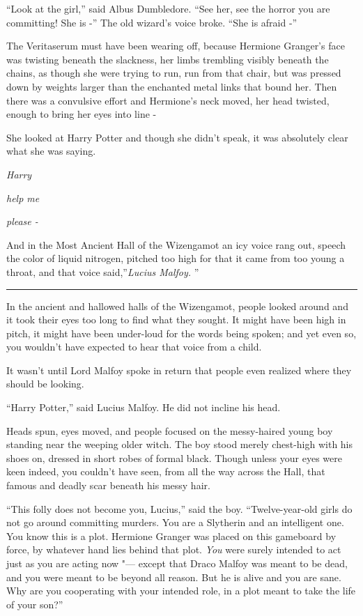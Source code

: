 ``Look at the girl,'' said Albus Dumbledore. ``See her, see the horror
you are committing! She is -'' The old wizard's voice broke. ``She is
afraid -''

The Veritaserum must have been wearing off, because Hermione Granger's
face was twisting beneath the slackness, her limbs trembling visibly
beneath the chains, as though she were trying to run, run from that
chair, but was pressed down by weights larger than the enchanted metal
links that bound her. Then there was a convulsive effort and Hermione's
neck moved, her head twisted, enough to bring her eyes into line -

She looked at Harry Potter and though she didn't speak, it was
absolutely clear what she was saying.

\emph{Harry}

\emph{help me}

\emph{please -}

And in the Most Ancient Hall of the Wizengamot an icy voice rang out,
speech the color of liquid nitrogen, pitched too high for that it came
from too young a throat, and that voice said,''\emph{Lucius Malfoy.} ''

\begin{center}\rule{3in}{0.4pt}\end{center}

In the ancient and hallowed halls of the Wizengamot, people looked
around and it took their eyes too long to find what they sought. It
might have been high in pitch, it might have been under-loud for the
words being spoken; and yet even so, you wouldn't have expected to hear
that voice from a child.

It wasn't until Lord Malfoy spoke in return that people even realized
where they should be looking.

``Harry Potter,'' said Lucius Malfoy. He did not incline his head.

Heads spun, eyes moved, and people focused on the messy-haired young boy
standing near the weeping older witch. The boy stood merely chest-high
with his shoes on, dressed in short robes of formal black. Though unless
your eyes were keen indeed, you couldn't have seen, from all the way
across the Hall, that famous and deadly scar beneath his messy hair.

``This folly does not become you, Lucius,'' said the boy.
``Twelve-year-old girls do not go around committing murders. You are a
Slytherin and an intelligent one. You know this is a plot. Hermione
Granger was placed on this gameboard by force, by whatever hand lies
behind that plot. \emph{You} were surely intended to act just as you are
acting now "--- except that Draco Malfoy was meant to be dead, and you were
meant to be beyond all reason. But he is alive and you are sane. Why are
you cooperating with your intended role, in a plot meant to take the
life of your son?''

